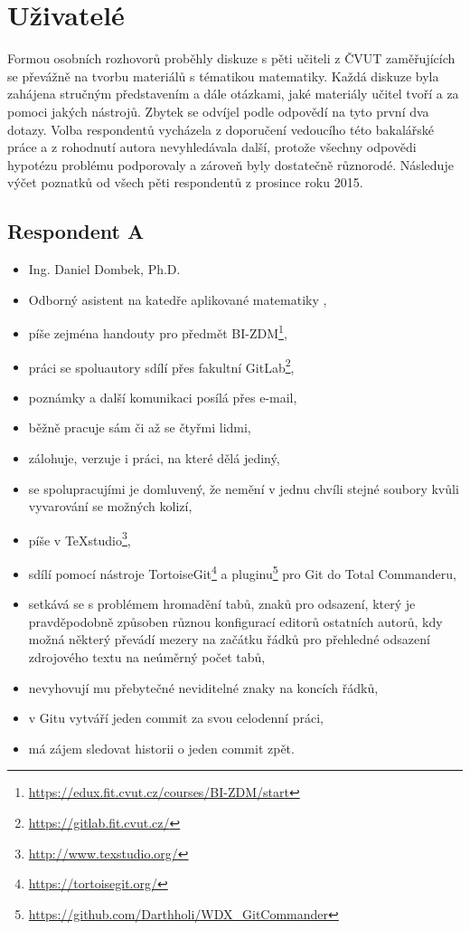 \section{Uživatelé}

Formou osobních rozhovorů proběhly diskuze s pěti učiteli z ČVUT zaměřujících se převážně na tvorbu materiálů s tématikou matematiky. Každá diskuze byla zahájena stručným představením a dále otázkami, jaké materiály učitel tvoří a za pomoci jakých nástrojů. Zbytek se odvíjel podle odpovědí na tyto první dva dotazy. Volba respondentů vycházela z doporučení vedoucího této bakalářské práce a z rohodnutí autora nevyhledávala další, protože všechny odpovědi hypotézu problému podporovaly a zároveň byly dostatečně různorodé. Následuje výčet poznatků od všech pěti respondentů z prosince roku 2015.

\subsection{Respondent A}

\begin{itemize}
	\item Ing. Daniel Dombek, Ph.D.
	\item Odborný asistent na katedře aplikované matematiky \cite{kam},
	\item píše zejména handouty pro předmět BI-ZDM\footnote{\url{https://edux.fit.cvut.cz/courses/BI-ZDM/start}},
	\item práci se spoluautory sdílí přes fakultní GitLab\footnote{\url{https://gitlab.fit.cvut.cz/}},
	\item poznámky a další komunikaci posílá přes e-mail,
	\item běžně pracuje sám či až se čtyřmi lidmi,
	\item zálohuje, verzuje i práci, na které dělá jediný,
	\item se spolupracujími je domluvený, že nemění v jednu chvíli stejné soubory kvůli vyvarování se možných kolizí,
	\item píše v TeXstudio\footnote{\url{http://www.texstudio.org/}},
	\item sdílí pomocí nástroje TortoiseGit\footnote{\url{https://tortoisegit.org/}} a pluginu\footnote{\url{https://github.com/Darthholi/WDX\_GitCommander}} pro Git do Total Commanderu,
	\item setkává se s problémem hromadění tabů, znaků pro odsazení, který je pravděpodobně způsoben různou konfigurací editorů ostatních autorů, kdy možná některý převádí mezery na začátku řádků pro přehledné odsazení zdrojového textu na neúměrný počet tabů,
	\item nevyhovují mu přebytečné neviditelné znaky na koncích řádků,
	\item v Gitu vytváří jeden commit za svou celodenní práci,
	\item má zájem sledovat historii o jeden commit zpět.
\end{itemize}


